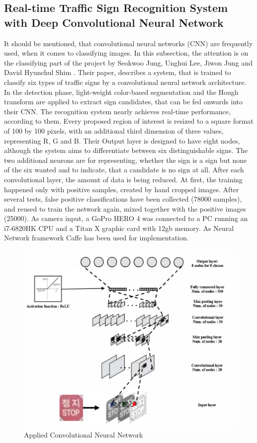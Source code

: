 \subsection{Real-time Traffic Sign Recognition System with Deep Convolutional Neural Network}
It should be mentioned, that convolutional neural networks (CNN) are frequently used, when it comes to classifying images.
In this subsection, the attention is on the classifying part of the project by Seokwoo Jung, Unghui Lee, Jiwon Jung and David Hyunchul Shim \cite{tsrcnn}. 
Their paper, describes a system, that is trained to classify six types of traffic signs by a convolutional
neural network architecture. In the detection phase, light-weight color-based segmentation and the Hough transform  are applied to extract sign candidates, that can be fed onwards into their CNN. The recognition system nearly achieves real-time performance, according to them. \newline
Every proposed region of interest is resized to a square format of 100 by 100 pixels, with an additional third dimension of three values, representing R, G and B. Their Output layer is designed to have eight nodes, although the system aims to differentiate between six distinguishable signs. The two additional neurons are for representing, whether the sign is a sign but none of the six wanted and to indicate, that a candidate is no sign at all. After each convolutional layer, the amount of data is being reduced.  
At first, the
training happened only with positive samples, created by hand cropped images. After several tests, false positive classifications have been collected (78000 samples), and reused to train the network again, mixed together with the positive images (25000). As camera input, a GoPro HERO 4 was connected to a PC running an i7-6820HK CPU and a Titan X graphic card with 12gb memory. As Neural Network framework Caffe has been used for implementation.

\begin{figure}[H]
	\centering
	\includegraphics[width = 0.75\linewidth]{images/koreancnn.png}
	\caption{Applied Convolutional Neural Network \cite{tsrcnn}}
	\label{fig:koreanNN }
\end{figure}
